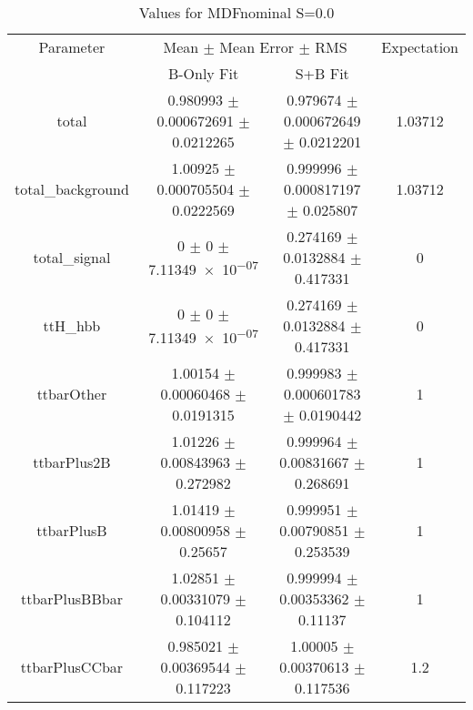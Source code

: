 \begin{table}
\centering
\caption{Values for MDFnominal S=0.0}
\begin{tabular}{cccc}
\toprule
Parameter & \multicolumn{2}{c}{Mean $\pm$ Mean Error $\pm$ RMS} & Expectation\\
 & B-Only Fit & S+B Fit & \\
\midrule
total & \num{0.980993} $\pm$ \num{0.000672691} $\pm$ \num{0.0212265} & \num{0.979674} $\pm$ \num{0.000672649} $\pm$ \num{0.0212201} & \num{1.03712}\\
total\_background & \num{1.00925} $\pm$ \num{0.000705504} $\pm$ \num{0.0222569} & \num{0.999996} $\pm$ \num{0.000817197} $\pm$ \num{0.025807} & \num{1.03712}\\
total\_signal & \num{0} $\pm$ \num{0} $\pm$ \num{7.11349e-07} & \num{0.274169} $\pm$ \num{0.0132884} $\pm$ \num{0.417331} & \num{0}\\
ttH\_hbb & \num{0} $\pm$ \num{0} $\pm$ \num{7.11349e-07} & \num{0.274169} $\pm$ \num{0.0132884} $\pm$ \num{0.417331} & \num{0}\\
ttbarOther & \num{1.00154} $\pm$ \num{0.00060468} $\pm$ \num{0.0191315} & \num{0.999983} $\pm$ \num{0.000601783} $\pm$ \num{0.0190442} & \num{1}\\
ttbarPlus2B & \num{1.01226} $\pm$ \num{0.00843963} $\pm$ \num{0.272982} & \num{0.999964} $\pm$ \num{0.00831667} $\pm$ \num{0.268691} & \num{1}\\
ttbarPlusB & \num{1.01419} $\pm$ \num{0.00800958} $\pm$ \num{0.25657} & \num{0.999951} $\pm$ \num{0.00790851} $\pm$ \num{0.253539} & \num{1}\\
ttbarPlusBBbar & \num{1.02851} $\pm$ \num{0.00331079} $\pm$ \num{0.104112} & \num{0.999994} $\pm$ \num{0.00353362} $\pm$ \num{0.11137} & \num{1}\\
ttbarPlusCCbar & \num{0.985021} $\pm$ \num{0.00369544} $\pm$ \num{0.117223} & \num{1.00005} $\pm$ \num{0.00370613} $\pm$ \num{0.117536} & \num{1.2}\\
\bottomrule
\end{tabular}
\end{table}